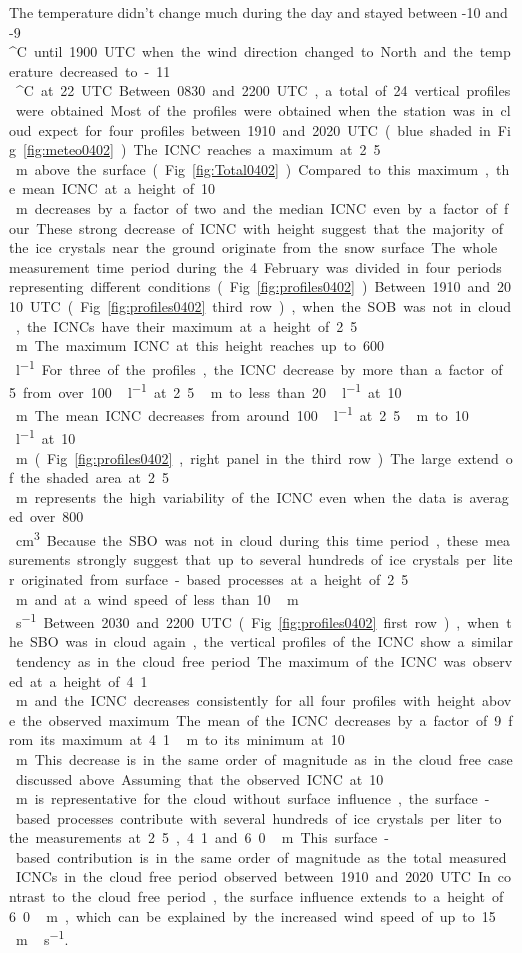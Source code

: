 \documentclass[draft,linenumbers]{agujournal}
\begin{document}
The temperature didn't change much during the day and stayed between -10 and -9\,\si{^\circ C} until 1900 UTC when the wind direction changed to North and the temperature decreased to -11\,\si{^\circ C} at 22 UTC.

Between 0830 and 2200 UTC, a total of 24 vertical profiles were obtained. Most of the profiles were obtained when the station was in cloud expect for four profiles between 1910 and 2020 UTC (blue shaded in Fig. \ref{fig:meteo0402}). The ICNC reaches a maximum at 2.5\,\si{m} above the surface (Fig. \ref{fig:Total0402}). Compared to this maximum, the mean ICNC at a height of 10\,\si{m} decreases by a factor of two and the median ICNC even by a factor of four. These strong decrease of ICNC with height suggest that the majority of the ice crystals near the ground originate from the snow surface.

The whole measurement time period during the 4 February was divided in four periods representing different conditions (Fig. \ref{fig:profiles0402}). Between 1910 and 2010 UTC (Fig. \ref{fig:profiles0402} third row), when the SOB was not in cloud, the ICNCs have their maximum at a height of 2.5\,\si{m}. The maximum ICNC at this height reaches up to 600\,\si{l^{-1}}. For three of the profiles, the ICNC decrease by more than a factor of 5 from over 100\,\si{l^{-1}} at 2.5\,\si{m} to less than 20\,\si{l^{-1}} at 10\,\si{m}. The mean ICNC decreases from around 100\,\si{l^{-1}} at 2.5\,\si{m} to 10\,\si{l^{-1}} at 10\,\si{m} (Fig. \ref{fig:profiles0402}, right panel in the third row). The large extend of the shaded area at 2.5\,\si{m} represents the high variability of the ICNC even when the data is averaged over 800\,\si{cm^3}. Because the SBO was not in cloud during this time period, these measurements strongly suggest that up to several hundreds of ice crystals per liter originated from surface-based processes at a height of 2.5\,\si{m} and at a wind speed of less than 10\,\si{m\,s^{-1}}. 

Between 2030 and 2200 UTC (Fig. \ref{fig:profiles0402} first row), when the SBO was in cloud again, the vertical profiles of the ICNC show a similar tendency as in the cloud free period. The maximum of the ICNC was observed at a height of 4.1\,\si{m} and the ICNC decreases consistently for all four profiles with height above the observed maximum. The mean of the ICNC decreases by a factor of 9 from its maximum at 4.1\,\si{m} to its minimum at 10\,\si{m}. This decrease is in the same order of magnitude as in the cloud free case discussed above. Assuming that the observed ICNC at 10\,\si{m} is representative for the cloud without surface influence, the surface-based processes contribute with several hundreds of ice crystals per liter to the measurements at 2.5, 4.1 and 6.0\,\si{m}. This surface-based contribution is in the same order of magnitude as the total measured ICNCs in the cloud free period observed between 1910 and 2020 UTC. In contrast to the cloud free period, the surface influence extends to a height of 6.0\,\si{m}, which can be explained by the increased wind speed of up to 15\,\si{m\,s^{-1}}. 
\end{document}
